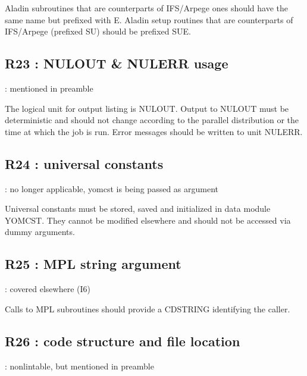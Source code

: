 \documentclass[letterpaper,10pt,english]{sphinxmanual}
\begin{document}
\sphinxAtStartPar
Aladin subroutines that are counterparts of IFS/Arpege ones should have the same name but prefixed
with E.
Aladin setup routines that are counterparts of IFS/Arpege (prefixed SU) should be prefixed SUE.

\sphinxstepscope


\subsection{R23 :  NULOUT \& NULERR usage}
\label{\detokenize{obsolescent/r23:r23-nulout-nulerr-usage}}\label{\detokenize{obsolescent/r23::doc}}
\sphinxAtStartPar
{} : mentioned in preamble

\sphinxAtStartPar
The logical unit for output listing is NULOUT.
Output to NULOUT must be deterministic and should not change according to the
parallel distribution or the time at which the job is run.
Error messages should be written to unit NULERR.

\sphinxstepscope


\subsection{R24 : universal constants}
\label{\detokenize{obsolescent/r24:r24-universal-constants}}\label{\detokenize{obsolescent/r24::doc}}
\sphinxAtStartPar
{} : no longer applicable, yomcst is being passed as argument

\sphinxAtStartPar
Universal  constants  must  be  stored,  saved  and initialized  in  data  module YOMCST.
They cannot be modified elsewhere and should not be accessed via dummy arguments.

\sphinxstepscope


\subsection{R25 :  MPL string argument}
\label{\detokenize{obsolescent/r25:r25-mpl-string-argument}}\label{\detokenize{obsolescent/r25::doc}}
\sphinxAtStartPar
{} : covered elsewhere (I6)

\sphinxAtStartPar
Calls to MPL subroutines should provide a CDSTRING identifying the caller.

\sphinxstepscope


\subsection{R26 :  code structure and file location}
\label{\detokenize{obsolescent/r26:r26-code-structure-and-file-location}}\label{\detokenize{obsolescent/r26::doc}}
\sphinxAtStartPar
{} : non\sphinxhyphen{}lintable, but mentioned in preamble
\end{document}
